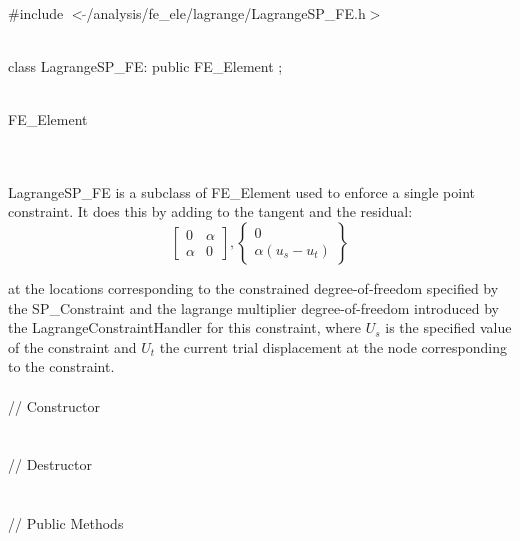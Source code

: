 
   \\
\#include $<\tilde{ }$/analysis/fe\_ele/lagrange/LagrangeSP\_FE.h$>$  


  \\
class LagrangeSP\_FE: public FE\_Element ;  


  \\
FE\_Element 

\indent{} \\ 

  \\
\indent LagrangeSP\_FE is a subclass of FE\_Element used to enforce a
single point constraint. It does this by adding to the tangent and the
residual:
$$ \left[ \begin{array}{cc} 0 & \alpha \\ \alpha & 0 \end{array}
\right] ,
\left\{ \begin{array}{c} 0 \\ \alpha(u_s - u_t) \end{array} \right\} $$

\noindent at the locations
corresponding to the constrained degree-of-freedom specified by the
SP\_Constraint and the lagrange multiplier degree-of-freedom
introduced by the LagrangeConstraintHandler for this constraint, where
$U_s$ is the specified value of the constraint 
and $U_t$ the current trial displacement at the node corresponding to
the constraint.\\

  \\
\indent\indent // Constructor  \\
\indent{} \\ \\
\indent\indent // Destructor  \\
\indent{}  \\ \\
\indent\indent // Public Methods \\
\indent{} \\  
\indent{} \\  
\indent{} \\  
\indent{}\\

